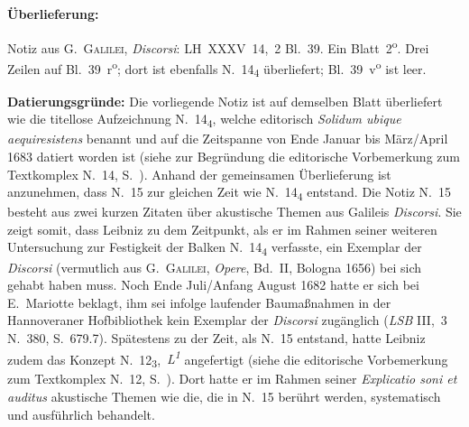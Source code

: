 %
%
%
%
\begin{ledgroupsized}[r]{120mm}
\footnotesize
\pstart
\noindent\textbf{Überlieferung:}
\pend
\end{ledgroupsized}
\begin{ledgroupsized}[r]{114mm}
\footnotesize
\pstart \parindent -6mm
%
Notiz aus \cite{00050}G.~\textsc{Galilei}, \textit{Discorsi}:
LH~XXXV~14,~2 Bl.~39.
Ein Blatt~2\textsuperscript{o}.
Drei Zeilen auf Bl.~39~r\textsuperscript{o};
dort ist ebenfalls N.~14\textsubscript{4} überliefert;
Bl.~39~v\textsuperscript{o} ist leer.
\pend
\end{ledgroupsized}
%
\vspace*{5mm}
\begin{ledgroup}
\footnotesize
\pstart\noindent
\noindent\textbf{Datierungsgründe:}
Die vorliegende Notiz ist auf demselben Blatt überliefert wie die titellose Aufzeich\-nung N.~14\textsubscript{4}, welche editorisch \textit{Solidum ubique aequiresistens} benannt und auf die Zeitspanne von Ende Januar bis März/April 1683 datiert worden ist (siehe zur Begründung die editorische Vorbemerkung zum Textkomplex N.~14, S.~).
Anhand der gemeinsamen Überlieferung ist anzunehmen, dass N.~15 zur gleichen Zeit wie N.~14\textsubscript{4} entstand.
\pend%
\pstart%
Die Notiz N.~15 besteht aus zwei kurzen Zitaten über akustische Themen aus Galileis \textit{Discorsi}. 
Sie zeigt somit, dass Leibniz zu dem Zeitpunkt, als er im Rahmen seiner weiteren Untersuchung zur Festigkeit der Balken N.~14\textsubscript{4} verfasste, ein Exemplar der \textit{Discorsi} (vermutlich aus G.~\textsc{Galilei}, \textit{Opere}, Bd.~II, Bologna 1656\cite{01084}) bei sich gehabt haben muss.
Noch Ende Juli/Anfang August 1682 hatte er sich bei E.~Mariotte beklagt, ihm sei infolge laufender Baumaßnahmen in der Hannoveraner Hofbibliothek kein Exemplar der \textit{Discorsi} zugänglich (\cite{01263}\textit{LSB} III,~3 N.~380, S.~679.7).%
\protect{}%
\protect{}%
\protect{}%
\pend%
\pstart%
Spätestens zu der Zeit, als N.~15 entstand, hatte Leibniz zudem das Konzept N.~12\textsubscript{3},~\textit{L\textsuperscript{1}} angefertigt (siehe die editorische Vorbemerkung zum Textkomplex N.~12, S.~).
Dort hatte er im Rahmen seiner \textit{Explicatio soni et auditus} akustische Themen wie die, die in N.~15 berührt werden, systematisch und ausführlich behandelt.
\pend
\end{ledgroup}
